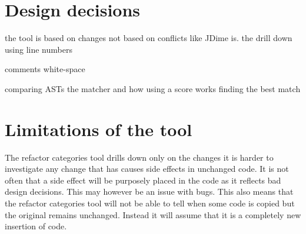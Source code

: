 

% 

\section{Design decisions}


the tool is based on changes not based on conflicts like JDime is.
the drill down using line numbers


comments
white-space

comparing ASTs
the matcher and how using a score works
finding the best match


% 

\section{Limitations of the tool}
The refactor categories tool drills down only on the changes it is harder to investigate any change that has causes side effects in unchanged code.  It is not often that a side effect will be purposely placed in the code as it reflects bad design decisions.  This may however be an issue with bugs.  This also means that the refactor categories tool will not be able to tell when some code is copied but the original remains unchanged. Instead it will assume that it is a completely new insertion of code.
